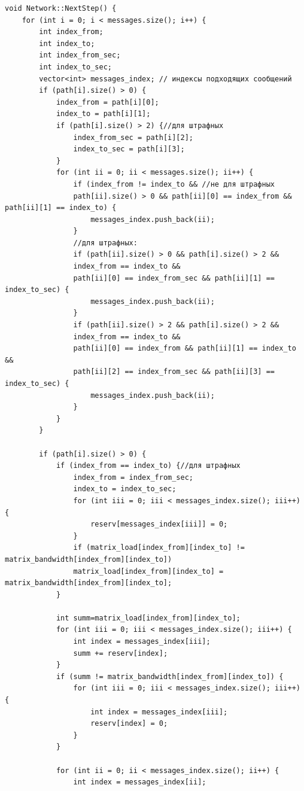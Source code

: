 \documentclass[11pt,a4paper,final]{article} %
\begin{document}
\begin{lstlisting}[label=lst4, caption = {Метод NextStep}]
void Network::NextStep() {
	for (int i = 0; i < messages.size(); i++) {
		int index_from;
		int index_to;
		int index_from_sec;
		int index_to_sec;
		vector<int> messages_index; // индексы подходящих сообщений
		if (path[i].size() > 0) {
			index_from = path[i][0];
			index_to = path[i][1];
			if (path[i].size() > 2) {//для штрафных
				index_from_sec = path[i][2];
				index_to_sec = path[i][3];
			}
			for (int ii = 0; ii < messages.size(); ii++) {
				if (index_from != index_to && //не для штрафных
				path[ii].size() > 0 && path[ii][0] == index_from && path[ii][1] == index_to) {
					messages_index.push_back(ii);
				}
				//для штрафных:
				if (path[ii].size() > 0 && path[i].size() > 2 &&
				index_from == index_to &&
				path[ii][0] == index_from_sec && path[ii][1] == index_to_sec) {
					messages_index.push_back(ii);
				}
				if (path[ii].size() > 2 && path[i].size() > 2 &&
				index_from == index_to &&
				path[ii][0] == index_from && path[ii][1] == index_to &&
				path[ii][2] == index_from_sec && path[ii][3] == index_to_sec) {
					messages_index.push_back(ii);
				}
			}
		}
		
		if (path[i].size() > 0) {
			if (index_from == index_to) {//для штрафных
				index_from = index_from_sec;
				index_to = index_to_sec;
				for (int iii = 0; iii < messages_index.size(); iii++) {
					reserv[messages_index[iii]] = 0;
				}
				if (matrix_load[index_from][index_to] != matrix_bandwidth[index_from][index_to])
				matrix_load[index_from][index_to] = matrix_bandwidth[index_from][index_to];
			}
			
			int summ=matrix_load[index_from][index_to];
			for (int iii = 0; iii < messages_index.size(); iii++) {
				int index = messages_index[iii];
				summ += reserv[index];
			}
			if (summ != matrix_bandwidth[index_from][index_to]) {
				for (int iii = 0; iii < messages_index.size(); iii++) {
					int index = messages_index[iii];
					reserv[index] = 0;
				}
			}
			
			for (int ii = 0; ii < messages_index.size(); ii++) {
				int index = messages_index[ii];
				

\end{lstlisting}
\end{document}
